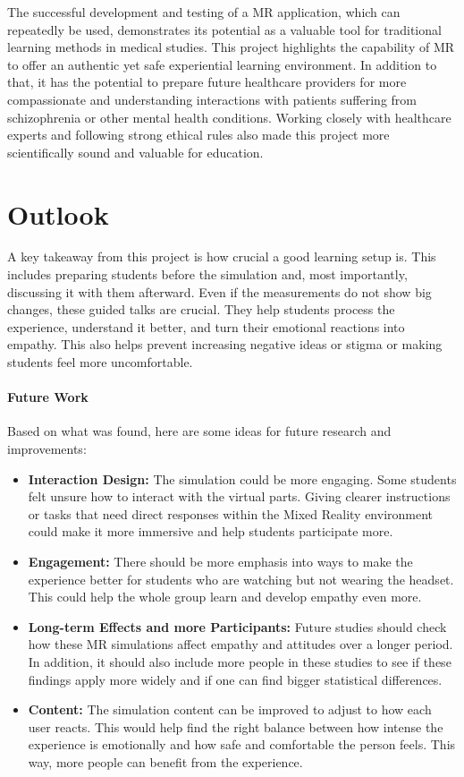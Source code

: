 The successful development and testing of a MR application, which can repeatedly be used, demonstrates its potential as a valuable tool for traditional learning methods in medical studies. This project highlights the capability of MR to offer an authentic yet safe experiential learning environment. In addition to that, it has the potential to prepare future healthcare providers for more compassionate and understanding interactions with patients suffering from schizophrenia or other mental health conditions. Working closely with healthcare experts and following strong ethical rules also made this project more scientifically sound and valuable for education.


\section{Outlook}

A key takeaway from this project is how crucial a good learning setup is. This includes preparing students before the simulation and, most importantly, discussing it with them afterward. Even if the measurements do not show big changes, these guided talks are crucial. They help students process the experience, understand it better, and turn their emotional reactions into empathy. This also helps prevent increasing negative ideas or stigma or making students feel more uncomfortable.

\paragraph{Future Work}
Based on what was found, here are some ideas for future research and improvements:

\begin{itemize}
    \item \textbf{Interaction Design:} The simulation could be more engaging. Some students felt unsure how to interact with the virtual parts. Giving clearer instructions or tasks that need direct responses within the Mixed Reality environment could make it more immersive and help students participate more.
    \item \textbf{Engagement:} There should be more emphasis into ways to make the experience better for students who are watching but not wearing the headset. This could help the whole group learn and develop empathy even more.
    \item \textbf{Long-term Effects and more Participants:} Future studies should check how these MR simulations affect empathy and attitudes over a longer period. In addition, it should also include more people in these studies to see if these findings apply more widely and if one can find bigger statistical differences.
    \item \textbf{Content:} The simulation content can be improved to adjust to how each user reacts. This would help find the right balance between how intense the experience is emotionally and how safe and comfortable the person feels. This way, more people can benefit from the experience.
\end{itemize}


